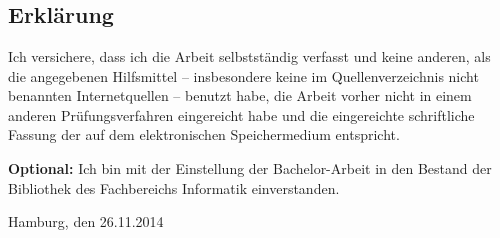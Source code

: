 \documentclass[
	12pt,
	a4paper,
	BCOR10mm,
	DIV14,
	listof=totoc,
	bibliography=totoc,
	headsepline
]{scrreprt}
\begin{document}




\tableofcontents 				  %













\nocite{*}
\printbibliography


\listoffigures
\listoftables
\lstlistoflistings


\begin{appendices}

\end{appendices}

\newpage

\thispagestyle{empty}

\chapter*{}

\section*{Erklärung}

Ich versichere, dass ich die Arbeit selbstständig verfasst und keine anderen, als die angegebenen Hilfsmittel -- insbesondere keine im Quellenverzeichnis nicht benannten Internetquellen -- benutzt habe, die Arbeit vorher nicht in einem anderen Prüfungsverfahren eingereicht habe und die eingereichte schriftliche Fassung der auf dem elektronischen Speichermedium entspricht.

\smallskip

\textbf{Optional:} Ich bin mit der Einstellung der Bachelor-Arbeit in den Bestand der Bibliothek des Fachbereichs Informatik einverstanden.

\bigskip
\bigskip
\bigskip

Hamburg, den 26.11.2014  \quad \dotfill
\end{document}
